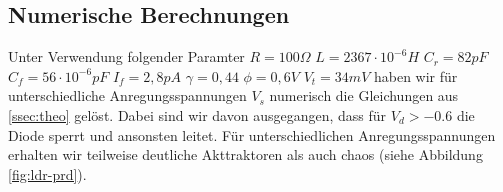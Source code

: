 \documentclass{scrartcl}
\begin{document}
\subsection{ Numerische Berechnungen } \label{ssec:num}
Unter Verwendung folgender Paramter
\newline
$R=100\Omega$
\newline
$L=2367\cdot10^{-6} H$
\newline
$C_r=82 pF$
\newline
$C_f=56 \cdot10^{-6}  pF$
\newline
$I_f=2,8pA$
\newline
$\gamma=0,44$
\newline
$\phi=0,6V$
\newline
$V_t=34mV$
\newline
haben wir für unterschiedliche Anregungsspannungen $V_s$ numerisch die Gleichungen aus  \ref{ssec:theo} gelöst. Dabei sind wir davon ausgegangen, dass für $V_d > -0.6$ die Diode sperrt und ansonsten leitet.
\newline
Für unterschiedlichen Anregungsspannungen erhalten wir teilweise deutliche Akttraktoren als auch chaos (siehe Abbildung \ref{fig:ldr-prd}).
\newline
\end{document}
